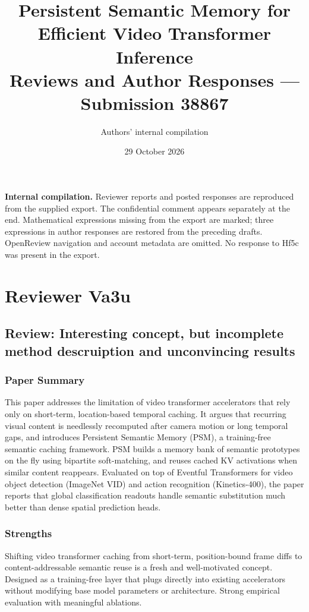 \documentclass[11pt]{article}
\title{Persistent Semantic Memory for Efficient Video Transformer Inference\\[0.5em]\large Reviews and Author Responses --- Submission 38867}
\author{Authors' internal compilation}
\date{29 October 2026}
\begin{document}
\maketitle
\noindent\textbf{Internal compilation.} Reviewer reports and posted responses are reproduced from the supplied export. The confidential comment appears separately at the end. Mathematical expressions missing from the export are marked; three expressions in author responses are restored from the preceding drafts. OpenReview navigation and account metadata are omitted. No response to Hf5c was present in the export.
\tableofcontents


\clearpage

\section{Reviewer Va3u}

\subsection*{Review: Interesting concept, but incomplete method descruiption and unconvincing results}

\subsubsection*{Paper Summary}
This paper addresses the limitation of video transformer accelerators that rely only on short-term, location-based temporal caching. It argues that recurring visual content is needlessly recomputed after camera motion or long temporal gaps, and introduces Persistent Semantic Memory (PSM), a training-free semantic caching framework. PSM builds a memory bank of semantic prototypes on the fly using bipartite soft-matching, and reuses cached KV activations when similar content reappears. Evaluated on top of Eventful Transformers for video object detection (ImageNet VID) and action recognition (Kinetics-400), the paper reports that global classification readouts handle semantic substitution much better than dense spatial prediction heads.

\subsubsection*{Strengths}
Shifting video transformer caching from short-term, position-bound frame diffs to content-addressable semantic reuse is a fresh and well-motivated concept.
Designed as a training-free layer that plugs directly into existing accelerators without modifying base model parameters or architecture.
Strong empirical evaluation with meaningful ablations.
\end{document}
